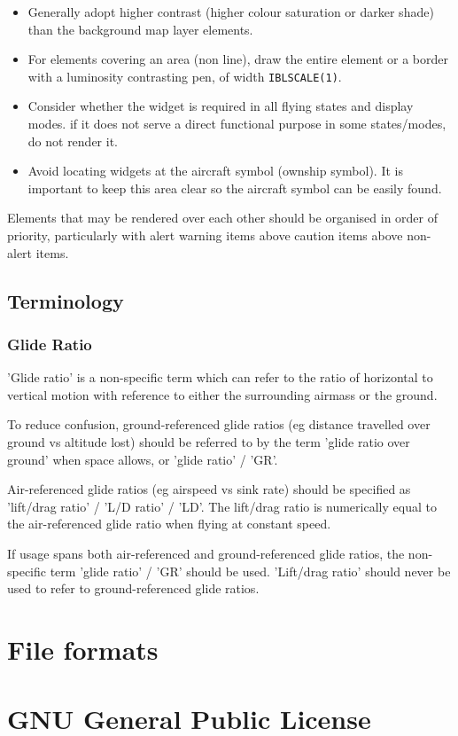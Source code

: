 \documentclass[a4paper,12pt]{refrep}
\begin{document}
\begin{itemize}
\item Generally adopt higher contrast (higher colour saturation or darker shade) 
 than the background map layer elements.

\item For elements covering an area (non line), draw the entire element or a border
with a luminosity contrasting pen, of width \verb|IBLSCALE(1)|.

\item Consider whether the widget is required in all flying states and display modes.
if it does not serve a direct functional purpose in some states/modes, do not
render it.

\item Avoid locating widgets at the aircraft symbol (ownship symbol).
It is important to keep this area clear so the aircraft symbol can be easily found.

\end{itemize}

Elements that may be rendered over each other should be organised in order of
priority, particularly with alert warning items above caution items above non-alert items.

\section{Terminology}
\subsection{Glide Ratio}
'Glide ratio' is a non-specific term which can refer to the ratio of horizontal to 
vertical motion with reference to either the surrounding airmass or the ground.

To reduce confusion, ground-referenced glide ratios (eg distance travelled over 
ground vs altitude lost) should be referred to by the term 'glide ratio over 
ground' when space allows, or 'glide ratio' / 'GR'.

Air-referenced glide ratios (eg airspeed vs sink rate) should be specified as 
'lift/drag ratio' / 'L/D ratio' / 'LD'. The lift/drag ratio is numerically equal 
to the air-referenced glide ratio when flying at constant speed.

If usage spans both air-referenced and ground-referenced glide ratios, the 
non-specific term 'glide ratio' / 'GR' should be used. 'Lift/drag ratio' should 
never be used to refer to ground-referenced glide ratios.

\chapter{File formats}\label{cha:file_formats}





\appendix

\chapter{GNU General Public License}\label{cha:gnu-general-public}

\end{document}
